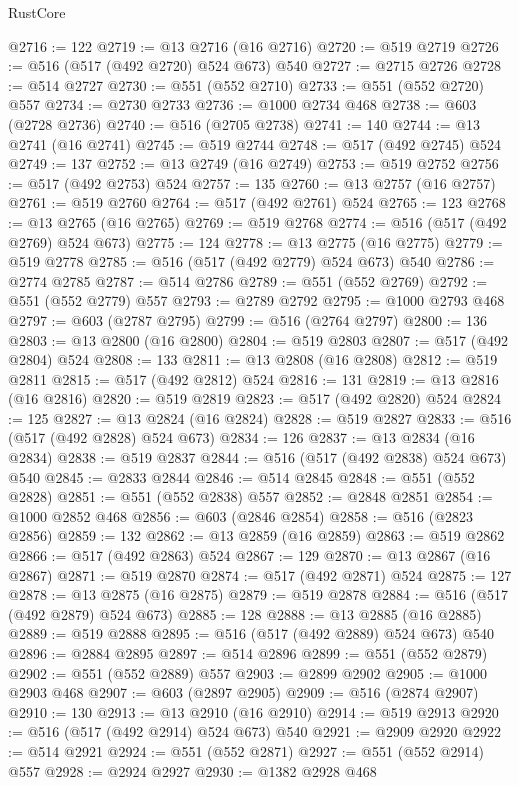 \begin{lexlean}{RustCore}
\begin{coremodule}
@2716 := 122
@2719 := @13 @2716 (@16 @2716)
@2720 := @519 @2719
@2726 := @516 (@517 (@492 @2720) @524 @673) @540
@2727 := @2715 @2726
@2728 := @514 @2727
@2730 := @551 (@552 @2710)
@2733 := @551 (@552 @2720) @557
@2734 := @2730 @2733
@2736 := @1000 @2734 @468
@2738 := @603 (@2728 @2736)
@2740 := @516 (@2705 @2738)
@2741 := 140
@2744 := @13 @2741 (@16 @2741)
@2745 := @519 @2744
@2748 := @517 (@492 @2745) @524
@2749 := 137
@2752 := @13 @2749 (@16 @2749)
@2753 := @519 @2752
@2756 := @517 (@492 @2753) @524
@2757 := 135
@2760 := @13 @2757 (@16 @2757)
@2761 := @519 @2760
@2764 := @517 (@492 @2761) @524
@2765 := 123
@2768 := @13 @2765 (@16 @2765)
@2769 := @519 @2768
@2774 := @516 (@517 (@492 @2769) @524 @673)
@2775 := 124
@2778 := @13 @2775 (@16 @2775)
@2779 := @519 @2778
@2785 := @516 (@517 (@492 @2779) @524 @673) @540
@2786 := @2774 @2785
@2787 := @514 @2786
@2789 := @551 (@552 @2769)
@2792 := @551 (@552 @2779) @557
@2793 := @2789 @2792
@2795 := @1000 @2793 @468
@2797 := @603 (@2787 @2795)
@2799 := @516 (@2764 @2797)
@2800 := 136
@2803 := @13 @2800 (@16 @2800)
@2804 := @519 @2803
@2807 := @517 (@492 @2804) @524
@2808 := 133
@2811 := @13 @2808 (@16 @2808)
@2812 := @519 @2811
@2815 := @517 (@492 @2812) @524
@2816 := 131
@2819 := @13 @2816 (@16 @2816)
@2820 := @519 @2819
@2823 := @517 (@492 @2820) @524
@2824 := 125
@2827 := @13 @2824 (@16 @2824)
@2828 := @519 @2827
@2833 := @516 (@517 (@492 @2828) @524 @673)
@2834 := 126
@2837 := @13 @2834 (@16 @2834)
@2838 := @519 @2837
@2844 := @516 (@517 (@492 @2838) @524 @673) @540
@2845 := @2833 @2844
@2846 := @514 @2845
@2848 := @551 (@552 @2828)
@2851 := @551 (@552 @2838) @557
@2852 := @2848 @2851
@2854 := @1000 @2852 @468
@2856 := @603 (@2846 @2854)
@2858 := @516 (@2823 @2856)
@2859 := 132
@2862 := @13 @2859 (@16 @2859)
@2863 := @519 @2862
@2866 := @517 (@492 @2863) @524
@2867 := 129
@2870 := @13 @2867 (@16 @2867)
@2871 := @519 @2870
@2874 := @517 (@492 @2871) @524
@2875 := 127
@2878 := @13 @2875 (@16 @2875)
@2879 := @519 @2878
@2884 := @516 (@517 (@492 @2879) @524 @673)
@2885 := 128
@2888 := @13 @2885 (@16 @2885)
@2889 := @519 @2888
@2895 := @516 (@517 (@492 @2889) @524 @673) @540
@2896 := @2884 @2895
@2897 := @514 @2896
@2899 := @551 (@552 @2879)
@2902 := @551 (@552 @2889) @557
@2903 := @2899 @2902
@2905 := @1000 @2903 @468
@2907 := @603 (@2897 @2905)
@2909 := @516 (@2874 @2907)
@2910 := 130
@2913 := @13 @2910 (@16 @2910)
@2914 := @519 @2913
@2920 := @516 (@517 (@492 @2914) @524 @673) @540
@2921 := @2909 @2920
@2922 := @514 @2921
@2924 := @551 (@552 @2871)
@2927 := @551 (@552 @2914) @557
@2928 := @2924 @2927
@2930 := @1382 @2928 @468

\end{coremodule}
\end{lexlean}
